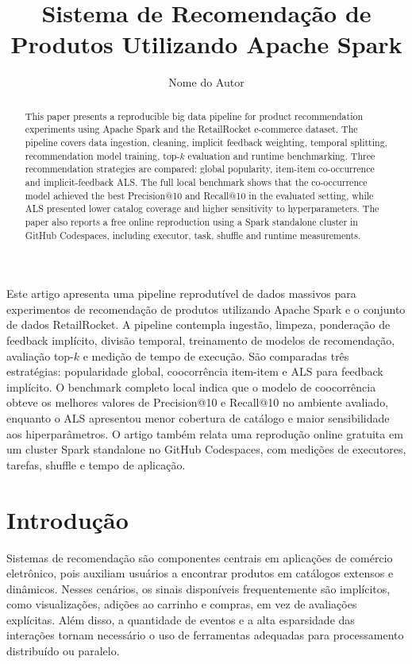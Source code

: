 \documentclass[12pt]{article}
\title{Sistema de Recomenda\c{c}\~ao de Produtos Utilizando Apache Spark}
\author{Nome do Autor\inst{1}}
\begin{document}
\maketitle

\begin{abstract}
This paper presents a reproducible big data pipeline for product
recommendation experiments using Apache Spark and the RetailRocket
e-commerce dataset. The pipeline covers data ingestion, cleaning, implicit
feedback weighting, temporal splitting, recommendation model training,
top-$k$ evaluation and runtime benchmarking. Three recommendation strategies
are compared: global popularity, item-item co-occurrence and
implicit-feedback ALS. The full local benchmark shows that the co-occurrence
model achieved the best Precision@10 and Recall@10 in the evaluated setting,
while ALS presented lower catalog coverage and higher sensitivity to
hyperparameters. The paper also reports a free online reproduction using a
Spark standalone cluster in GitHub Codespaces, including executor, task,
shuffle and runtime measurements.
\end{abstract}

\begin{resumo}
Este artigo apresenta uma pipeline reprodut\'ivel de dados massivos para
experimentos de recomenda\c{c}\~ao de produtos utilizando Apache Spark e o
conjunto de dados RetailRocket. A pipeline contempla ingest\~ao, limpeza,
pondera\c{c}\~ao de feedback impl\'icito, divis\~ao temporal, treinamento de
modelos de recomenda\c{c}\~ao, avalia\c{c}\~ao top-$k$ e medi\c{c}\~ao de tempo de
execu\c{c}\~ao. S\~ao comparadas tr\^es estrat\'egias: popularidade global,
coocorr\^encia item-item e ALS para feedback impl\'icito. O benchmark completo
local indica que o modelo de coocorr\^encia obteve os melhores valores de
Precision@10 e Recall@10 no ambiente avaliado, enquanto o ALS apresentou
menor cobertura de cat\'alogo e maior sensibilidade aos hiperpar\^ametros. O
artigo tamb\'em relata uma reprodu\c{c}\~ao online gratuita em um cluster Spark
standalone no GitHub Codespaces, com medi\c{c}\~oes de executores, tarefas,
shuffle e tempo de aplica\c{c}\~ao.
\end{resumo}

\section{Introdu\c{c}\~ao}

Sistemas de recomenda\c{c}\~ao s\~ao componentes centrais em aplica\c{c}\~oes de
com\'ercio eletr\^onico, pois auxiliam usu\'arios a encontrar produtos em
cat\'alogos extensos e din\^amicos. Nesses cen\'arios, os sinais dispon\'iveis
frequentemente s\~ao impl\'icitos, como visualiza\c{c}\~oes, adi\c{c}\~oes ao
carrinho e compras, em vez de avalia\c{c}\~oes expl\'icitas. Al\'em disso, a
quantidade de eventos e a alta esparsidade das intera\c{c}\~oes tornam
necess\'ario o uso de ferramentas adequadas para processamento distribu\'ido ou
paralelo.
\end{document}

